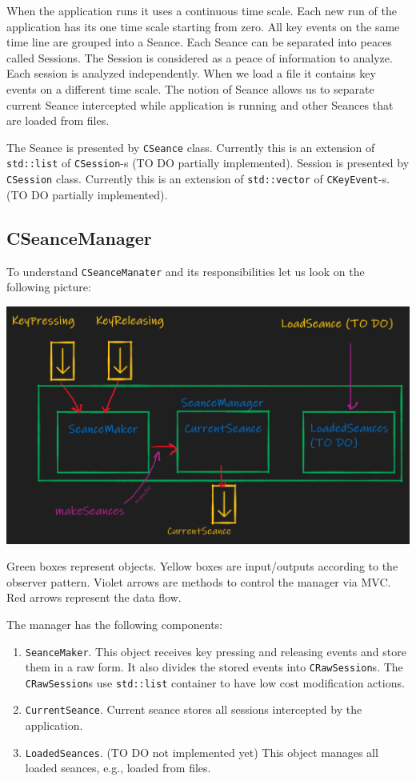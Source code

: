 \documentclass{article}
\begin{document}
When the application runs it uses a continuous time scale. Each new run of the application has its one time scale starting from zero. All key events on the same time line are grouped into a Seance. Each Seance can be separated into peaces called Sessions. The Session is considered as a peace of information to analyze. Each session is analyzed independently. When we load a file it contains key events on a different time scale. The notion of Seance allows us to separate current Seance intercepted while application is running and other Seances that are loaded from files.

The Seance is presented by \verb"CSeance" class. Currently this is an extension of \verb"std::list" of \verb"CSession"-s (TO DO partially implemented). Session is presented by \verb"CSession" class. Currently this is an extension of \verb"std::vector" of \verb"CKeyEvent"-s. (TO DO partially implemented).


\subsection{CSeanceManager}

To understand \verb"CSeanceManater" and its responsibilities let us look on the following picture:
\begin{center}
\includegraphics[scale = 0.4]{Figures/SeanceManager.png}

Green boxes represent objects. Yellow boxes are input/outputs according to the observer pattern. Violet arrows are methods to control the manager via MVC. Red arrows represent the data flow.
\end{center}

The manager has the following components:
\begin{enumerate}
\item \verb"SeanceMaker". This object receives key pressing and releasing events and store them in a raw form. It also divides the stored events into \verb"CRawSession"s. The \verb"CRawSession"s use \verb"std::list" container to have low cost modification actions.

\item \verb"CurrentSeance". Current seance stores all sessions intercepted by the application.

\item \verb"LoadedSeances". (TO DO not implemented yet) This object manages all loaded seances, e.g., loaded from files.
\end{enumerate}
\end{document}
